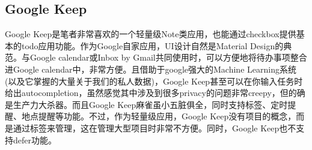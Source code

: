    \subsection{Google Keep}
    \label{sub:Google Keep}
        Google Keep是笔者非常喜欢的一个轻量级Note类应用，也能通过checkbox提供基本的todo应用功能。作为Google自家应用，UI设计自然是Material Design的典范。与Google calendar或Inbox by Gmail共同使用时，可以方便地将待办事项整合进Google calendar中，非常方便。且借助于google强大的Machine Learning系统(以及它掌握的大量关于我们的私人数据)，Google Keep甚至可以在你输入任务时给出autocompletion，虽然感觉其中涉及到很多privacy的问题非常creepy，但的确是生产力大杀器。而且Google Keep麻雀虽小五脏俱全，同时支持标签、定时提醒、地点提醒等功能。不过，作为轻量级应用，Google Keep没有项目的概念，而是通过标签来管理，这在管理大型项目时非常不方便。同时，Google Keep也不支持defer功能。
